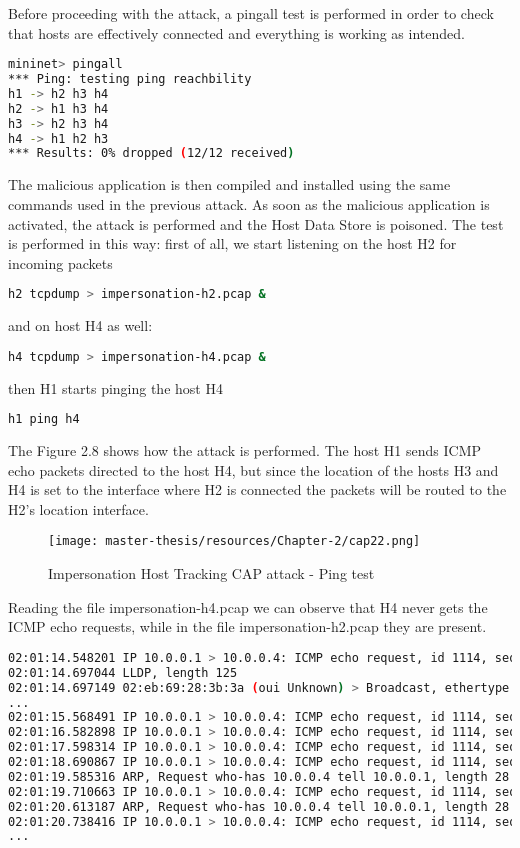 \documentclass[a4paper,10pt]{memoir}
\begin{document}
Before proceeding with the attack, a pingall test is performed in order to check that hosts are effectively connected and everything is working as intended.
\begin{lstlisting}[language=bash]
mininet> pingall
*** Ping: testing ping reachbility
h1 -> h2 h3 h4
h2 -> h1 h3 h4
h3 -> h2 h3 h4
h4 -> h1 h2 h3
*** Results: 0% dropped (12/12 received)
\end{lstlisting}

The malicious application is then compiled and installed using the same commands used in the previous attack. As soon as the malicious application is activated, the attack is performed and the Host Data Store is poisoned. The test is performed in this way: first of all, we start listening on the host H2 for incoming packets
\begin{lstlisting}[language=bash]
h2 tcpdump > impersonation-h2.pcap &
\end{lstlisting}

and on host H4 as well:
\begin{lstlisting}[language=bash]
h4 tcpdump > impersonation-h4.pcap &
\end{lstlisting}

then H1 starts pinging the host H4
\begin{lstlisting}[language=bash]
h1 ping h4
\end{lstlisting}

The Figure 2.8 shows how the attack is performed. The host H1 sends ICMP echo packets directed to the host H4, but since the location of the hosts H3 and H4 is set to the interface where H2 is connected the packets will be routed to the H2's location interface.
\begin{figure}[h]
\caption{Impersonation Host Tracking CAP attack - Ping test}
\label{fig:cap2-ping}
\texttt{[image: master-thesis/resources/Chapter-2/cap22.png]}
\centering
\end{figure}

Reading the file impersonation-h4.pcap we can observe that H4 never gets the ICMP echo requests, while in the file impersonation-h2.pcap they are present.
\begin{lstlisting}[language=bash]
02:01:14.548201 IP 10.0.0.1 > 10.0.0.4: ICMP echo request, id 1114, seq 1, length 64
02:01:14.697044 LLDP, length 125
02:01:14.697149 02:eb:69:28:3b:3a (oui Unknown) > Broadcast, ethertype Unknown (0x8942), length 139: 
...
02:01:15.568491 IP 10.0.0.1 > 10.0.0.4: ICMP echo request, id 1114, seq 2, length 64
02:01:16.582898 IP 10.0.0.1 > 10.0.0.4: ICMP echo request, id 1114, seq 3, length 64
02:01:17.598314 IP 10.0.0.1 > 10.0.0.4: ICMP echo request, id 1114, seq 4, length 64
02:01:18.690867 IP 10.0.0.1 > 10.0.0.4: ICMP echo request, id 1114, seq 5, length 64
02:01:19.585316 ARP, Request who-has 10.0.0.4 tell 10.0.0.1, length 28
02:01:19.710663 IP 10.0.0.1 > 10.0.0.4: ICMP echo request, id 1114, seq 6, length 64
02:01:20.613187 ARP, Request who-has 10.0.0.4 tell 10.0.0.1, length 28
02:01:20.738416 IP 10.0.0.1 > 10.0.0.4: ICMP echo request, id 1114, seq 7, length 64
...
\end{lstlisting}
\end{document}
